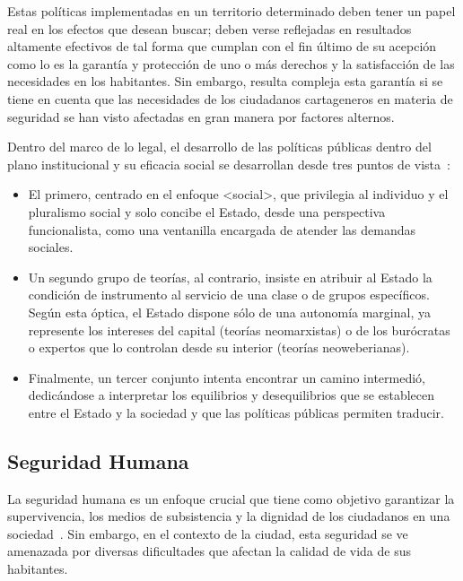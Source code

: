 \documentclass[letterpaper, 12pt]{article}
\begin{document}
Estas políticas implementadas en un territorio determinado
deben tener un papel real en los efectos que desean buscar;
deben verse reflejadas en resultados altamente efectivos de
tal forma que cumplan con el fin último de su acepción como
lo es la garantía y protección de uno o más derechos y la
satisfacción de las necesidades en los habitantes. Sin
embargo, resulta compleja esta garantía si se tiene en
cuenta que las necesidades de los ciudadanos cartageneros
en materia de seguridad se han visto afectadas en gran
manera por factores alternos.

Dentro del marco de lo legal, el desarrollo de las
políticas públicas dentro del plano institucional y su
eficacia social se desarrollan desde tres puntos de
vista~\cite{Thoenig}:

\begin{itemize}
    \item El primero, centrado en el enfoque <social>, que privilegia
          al individuo y el pluralismo social y solo concibe el
          Estado, desde una perspectiva funcionalista, como una
          ventanilla encargada de atender las demandas sociales.

    \item Un segundo grupo de teorías, al contrario, insiste en
          atribuir al Estado la condición de instrumento al servicio
          de una clase o de grupos específicos. Según esta óptica, el
          Estado dispone sólo de una autonomía marginal, ya
          represente los intereses del capital (teorías neomarxistas)
          o de los burócratas o expertos que lo controlan desde su
          interior (teorías neoweberianas).

    \item Finalmente, un tercer conjunto intenta encontrar un camino
          intermedió, dedicándose a interpretar los equilibrios y
          desequilibrios que se establecen entre el Estado y la
          sociedad y que las políticas públicas permiten traducir.
\end{itemize}


\subsection*{Seguridad Humana}

La seguridad humana es un enfoque crucial que tiene como
objetivo garantizar la supervivencia, los medios de
subsistencia y la dignidad de los ciudadanos en una
sociedad~\cite{DSUAdmin}. Sin embargo, en el contexto de la
ciudad, esta seguridad se ve amenazada por diversas
dificultades que afectan la calidad de vida de sus
habitantes.
\end{document}

